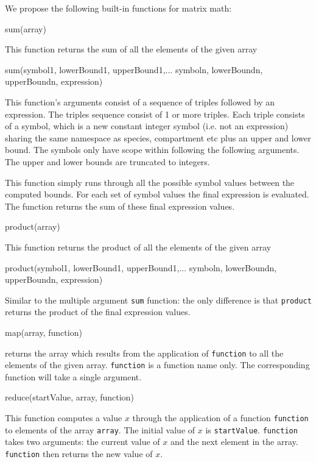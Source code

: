 \documentclass{cekarticle}
\begin{document}
We propose the following built-in functions for matrix math:

\begin{example}
sum(array)
\end{example}

This function returns the sum of all the elements of the given array

\begin{example}
sum(symbol1, lowerBound1, upperBound1,...
    symboln, lowerBoundn, upperBoundn, expression)
\end{example}
This function's arguments consist of a sequence of triples
followed by an expression.  The triples sequence consist of 1 or
more triples. Each triple consists of a symbol, which is a new
constant integer symbol (i.e. not an expression) sharing the same
namespace as species, compartment etc plus an upper and lower
bound.  The symbols only have scope within following the following
arguments.  The upper and lower bounds are truncated to integers.

This function simply runs through all the possible symbol values
between the computed bounds.  For each set of symbol values the
final expression is evaluated.  The function returns the sum of
these final expression values.

\begin{example}
product(array)
\end{example}
This function returns the product of all the elements of the
given array

\begin{example}
product(symbol1, lowerBound1, upperBound1,...
    symboln, lowerBoundn, upperBoundn, expression)
\end{example}
Similar to the multiple argument \texttt{sum} function: the only
difference is that \texttt{product} returns the product of the final
expression values.

\begin{example}
map(array, function)
\end{example}
returns the array which results from the application of
\texttt{function} to all the elements of the given array.
\texttt{function} is a function name only.  The corresponding
function will take a single argument.

\begin{example}
reduce(startValue, array, function)
\end{example}
This function computes a value $x$ through the application of a
function \texttt{function} to elements of the array
\texttt{array}.  The initial value of $x$ is
\texttt{startValue}.  \texttt{function} takes two arguments: the
current value of $x$ and the next element in the array.
\texttt{function} then returns the new value of $x$.
\end{document}
